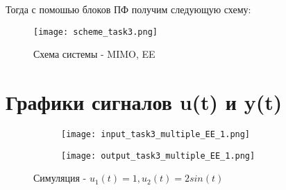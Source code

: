 Тогда с помошью блоков ПФ получим следующую схему:
\begin{figure}[ht]
  \centering
  \texttt{[image: scheme\_task3.png]}
\caption{Схема системы - MIMO, EE}
\end{figure}

\section{Графики сигналов u(t) и y(t)}

\begin{figure}[h]
	\begin{subfigure}{0.5\textwidth}
		\texttt{[image: input\_task3\_multiple\_EE\_1.png]} 
	\end{subfigure}
	\begin{subfigure}{0.5\textwidth}
		\texttt{[image: output\_task3\_multiple\_EE\_1.png]}
	\end{subfigure}
	\caption{Симуляция - $u_1(t) = 1 , u_2(t) = 2sin(t)$}
\end{figure}

\endinput